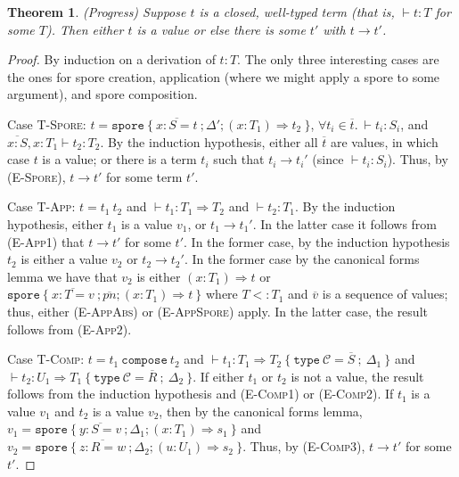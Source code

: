 \documentclass[a4paper,twoside]{article}
\newcommand{\seq}[1]{\overline{#1}}
\newtheorem{theorem}{Theorem}[section]
\begin{document}
\begin{theorem}
\emph{(Progress)}
\label{th:progress}
Suppose $t$ is a closed, well-typed term (that is, $\vdash t : T$ for some $T$). Then either $t$ is a value or else there is some $t'$ with $t \rightarrow t'$.
\end{theorem}
\begin{proof}
By induction on a derivation of $t : T$. The only three interesting cases are the ones for spore creation, application (where we might apply a spore to some argument), and spore composition.

Case \textsc{T-Spore}: $t = \texttt{spore}~\{~\seq{x : S = t}~; \Delta'; (x: T_1) \Rightarrow t_2~\}$, $\forall t_i \in \seq{t}.~\vdash t_i : S_i$, and $\seq{x : S}, x : T_1 \vdash t_2 : T_2$. By the induction hypothesis, either all $\seq{t}$ are values, in which case $t$ is a value; or there is a term $t_i$ such that $t_i \rightarrow t_i'$ (since $\vdash t_i : S_i$). Thus, by (\textsc{E-Spore}), $t \rightarrow t'$ for some term $t'$.

Case \textsc{T-App}: $t = t_1~t_2$ and $\vdash t_1 : T_1 \Rightarrow T_2$ and $\vdash t_2 : T_1$. By the induction hypothesis, either $t_1$ is a value $v_1$, or $t_1 \rightarrow t_1'$. In the latter case it follows from (\textsc{E-App1}) that $t \rightarrow t'$ for some $t'$. In the former case, by the induction hypothesis $t_2$ is either a value $v_2$ or $t_2 \rightarrow t_2'$. In the former case by the canonical forms lemma we have that $v_2$ is either $(x: T_1) \Rightarrow t$ or $\texttt{spore}~\{~\seq{x : T = v}~; \seq{pn} ; (x: T_1) \Rightarrow t~\}$ where $T <: T_1$ and $\seq{v}$ is a sequence of values; thus, either (\textsc{E-AppAbs}) or (\textsc{E-AppSpore}) apply. In the latter case, the result follows from (\textsc{E-App2}).

Case \textsc{T-Comp}: $t = t_1~\texttt{compose}~t_2$ and $\vdash t_1 : T_1 \Rightarrow T_2~\{~\texttt{type}~\mathcal{C} = \seq{S}~;~\Delta_1~\}$ and $\vdash t_2 : U_1 \Rightarrow T_1~\{~\texttt{type}~\mathcal{C} = \seq{R}~;~\Delta_2~\}$. If either $t_1$ or $t_2$ is not a value, the result follows from the induction hypothesis and (\textsc{E-Comp1}) or (\textsc{E-Comp2}). If $t_1$ is a value $v_1$ and $t_2$ is a value $v_2$, then by the canonical forms lemma, $v_1 = \texttt{spore}~\{~\seq{y : S = v}~; \Delta_1; (x: T_1) \Rightarrow s_1~\}$ and $v_2 = \texttt{spore}~\{~\seq{z : R = w}~; \Delta_2; (u: U_1) \Rightarrow s_2~\}$. Thus, by (\textsc{E-Comp3}), $t \rightarrow t'$ for some $t'$.

\end{proof}
\end{document}
